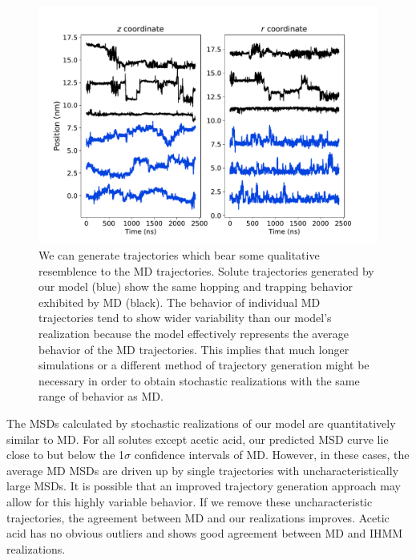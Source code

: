 \documentclass{article}
\begin{document}
  \begin{figure}
  \centering
  \includegraphics[width=\textwidth]{trajectory_realizations_MET.pdf}
  \caption{We can generate trajectories which bear some qualitative resemblence to the MD 
  trajectories. Solute trajectories generated by our model (blue) show the same
  hopping and trapping behavior exhibited by MD (black). The behavior of individual 
  MD trajectories tend to show wider variability than our model's realization because
  the model effectively represents the average behavior of the MD trajectories. This 
  implies that much longer simulations or a different method of trajectory generation might
  be necessary in order to obtain stochastic realizations with the same range of behavior
  as MD.
   }\label{fig:trajectory_realizations_MET}
  \end{figure}
  
  The MSDs calculated by stochastic realizations of our model are quantitatively similar to
  MD. For all solutes except acetic acid, our predicted MSD curve lie close to but below the
  1$\sigma$ confidence intervals of MD. However, in these cases, the average MD MSDs are 
  driven up by single trajectories with uncharacteristically large MSDs. It is possible that
  an improved trajectory generation approach may allow for this highly variable behavior.
  If we remove these uncharacteristic trajectories, the agreement between MD and our realizations
  improves. Acetic acid has no obvious outliers and shows good agreement between MD and
  IHMM realizations.
  
\end{document}
